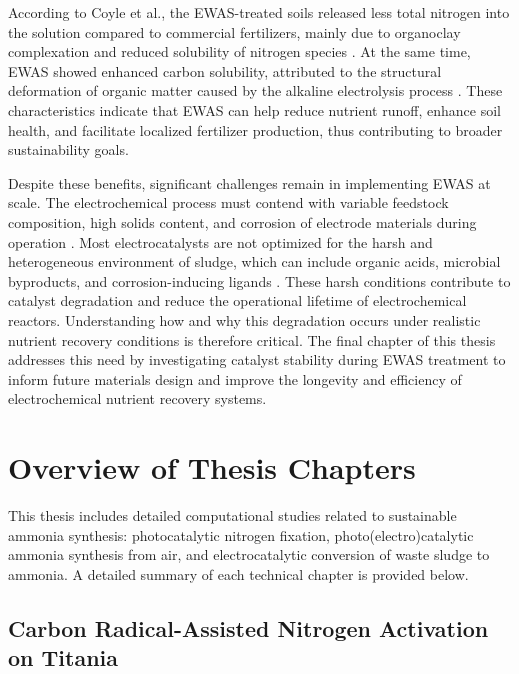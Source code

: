 According to Coyle et al., the EWAS-treated soils released less total nitrogen into the solution compared to commercial fertilizers, mainly due to organoclay complexation and reduced solubility of nitrogen species \cite{Coyle2025NovelCarbon, Marschner2008HowSoils}. At the same time, EWAS showed enhanced carbon solubility, attributed to the structural deformation of organic matter caused by the alkaline electrolysis process \cite{Sparks2003ChemistryMatter, Chen1976ScanningComplexes}. These characteristics indicate that EWAS can help reduce nutrient runoff, enhance soil health, and facilitate localized fertilizer production, thus contributing to broader sustainability goals.

Despite these benefits, significant challenges remain in implementing EWAS at scale. The electrochemical process must contend with variable feedstock composition, high solids content, and corrosion of electrode materials during operation \cite{Abbasi2024FundamentalsCompound, Ferreira-Garcia2025ElectrochemicalEconomy, JafariElectrochemicalProduction}. Most electrocatalysts are not optimized for the harsh and heterogeneous environment of sludge, which can include organic acids, microbial byproducts, and corrosion-inducing ligands \cite{Barragan2021LeachingOptimization, lekfeldt2017heavy, das2021studies, iqbal2015leaching}. These harsh conditions contribute to catalyst degradation and reduce the operational lifetime of electrochemical reactors. Understanding how and why this degradation occurs under realistic nutrient recovery conditions is therefore critical. The final chapter of this thesis addresses this need by investigating catalyst stability during EWAS treatment to inform future materials design and improve the longevity and efficiency of electrochemical nutrient recovery systems. 



\section{Overview of Thesis Chapters}

This thesis includes detailed computational studies related to sustainable ammonia synthesis: photocatalytic nitrogen fixation, photo(electro)catalytic ammonia synthesis from air, and electrocatalytic conversion of waste sludge to ammonia. A detailed summary of each technical chapter is provided below. 

\subsection{Carbon Radical-Assisted Nitrogen Activation on Titania}

